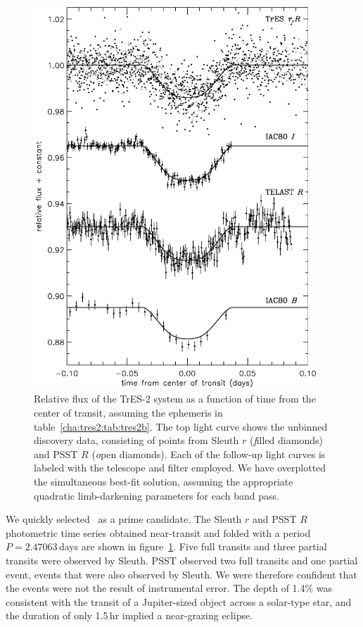 \begin{figure}
\begin{center}
\includegraphics[width=0.95\textwidth]{4_f1}
\caption[Relative flux versus time for the TrES-2 transiting system]{Relative flux of the TrES-2 system as a function of time
  from the center of transit, assuming the ephemeris in
  table~\ref{cha:tres2:tab:tres2b}. The top light curve shows the unbinned
  discovery data, consisting of points from Sleuth $r$ ({\textit filled
    diamonds}) and PSST $R$ ({\textit open diamonds}). Each of the
  follow-up light curves is labeled with the telescope and filter
  employed.  We have overplotted the simultaneous best-fit solution,
  assuming the appropriate quadratic limb-darkening parameters for
  each band pass.}\label{cha:tres2:fig:treslc}
\end{center}
\end{figure}

We quickly selected \tresTwo\ as a prime candidate. The Sleuth $r$ and
PSST $R$ photometric time series obtained near-transit and folded with
a period $P=2.47063$\,days are shown in figure~\ref{cha:tres2:fig:treslc}. Five
full transits and three partial transits were observed by Sleuth. PSST
observed two full transits and one partial event, events that were
also observed by Sleuth. We were therefore confident that the events
were not the result of instrumental error. The depth of 1.4\% was
consistent with the transit of a Jupiter-sized object across a
solar-type star, and the duration of only 1.5\,hr implied a
near-grazing eclipse.

